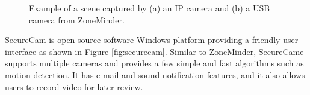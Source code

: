 \begin{figure}[t]
  \begin{center}
    \hspace{0.1in}
  \end{center}
  \caption[Example of a scene captured by ZoneMinder.]{\small Example
    of a scene captured by (a) an IP camera and (b) a USB camera from
    ZoneMinder.}
  \label{fig:zm-webcam}
\end{figure}

SecureCam  is \DIFdelbegin {}\DIFdelend \DIFaddbegin {}\DIFaddend open source software
\DIFdelbegin {}\DIFdelend \DIFaddbegin {}\DIFaddend Windows platform providing a friendly user interface as
shown in Figure \ref{fig:securecam}. Similar to ZoneMinder, SecureCame
supports multiple cameras and provides a few simple and fast
algorithms such as motion detection. It has e-mail and sound
notification features, and it also allows users to record video for
later review.

